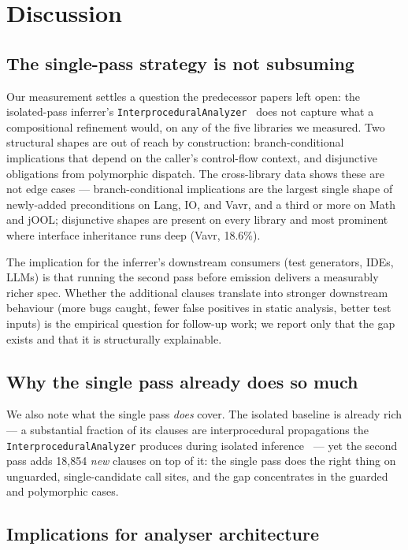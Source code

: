\section{Discussion}
\label{sec:discussion}

\subsection{The single-pass strategy is not subsuming}

Our measurement settles a question the predecessor papers left open: the isolated-pass inferrer's \texttt{InterproceduralAnalyzer}~\cite{edmonds2026inference} does not capture what a compositional refinement would, on any of the five libraries we measured. Two structural shapes are out of reach by
construction: branch-conditional implications that depend on the
caller's control-flow context, and disjunctive obligations from
polymorphic dispatch. The cross-library data shows these are not
edge cases --- branch-conditional implications are the largest single
shape of newly-added preconditions on Lang, IO, and Vavr, and a third
or more on Math and jOOL; disjunctive shapes are present on every
library and most prominent where interface inheritance runs deep
(Vavr, 18.6\%).

The implication for the inferrer's downstream consumers
(test generators, IDEs, LLMs) is that running the second pass before
emission delivers a measurably richer spec. Whether the additional
clauses translate into stronger downstream behaviour (more bugs
caught, fewer false positives in static analysis, better test
inputs) is the empirical question for follow-up work; we report only
that the gap exists and that it is structurally explainable.

\subsection{Why the single pass already does so much}

We also note what the single pass \emph{does} cover. The isolated
baseline is already rich --- a substantial fraction of its clauses
are interprocedural propagations the \texttt{InterproceduralAnalyzer}
produces during isolated inference~\cite{edmonds2026embedding} --- yet
the second pass adds 18{,}854 \emph{new} clauses on top of it: the
single pass does the right thing on unguarded, single-candidate call
sites, and the gap concentrates in the guarded and polymorphic cases.

\subsection{Implications for analyser architecture}


